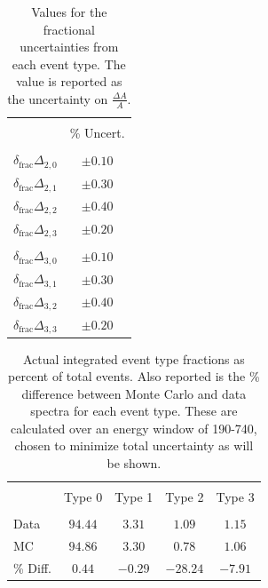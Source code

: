 \setlength{\tabcolsep}{12pt}

\begin{table}[h]
  \caption{Values for the fractional uncertainties from each
  event type. The value is reported as the uncertainty on $\frac{\Delta A}{A}$.} 
  \centering
  \begin{tabular}{l c }
    \hline \hline \\ [-1.75ex]
    & \% Uncert. \\
    \hline \\ [-1.75ex]
    $\delta_{\mathrm{frac}}\Delta_{2,0}$ & $\pm0.10$ \\ [0.50ex]
    $\delta_{\mathrm{frac}}\Delta_{2,1}$ & $\pm0.30$ \\ [0.50ex]
    $\delta_{\mathrm{frac}}\Delta_{2,2}$ & $\pm0.40$ \\ [0.50ex]
    $\delta_{\mathrm{frac}}\Delta_{2,3}$ & $\pm0.20$  \\ [0.50ex]
    \hline \\ [-1.75ex]
    $\delta_{\mathrm{frac}}\Delta_{3,0}$ & $\pm0.10$ \\ [0.50ex]
    $\delta_{\mathrm{frac}}\Delta_{3,1}$ & $\pm0.30$ \\ [0.50ex]
    $\delta_{\mathrm{frac}}\Delta_{3,2}$ & $\pm0.40$ \\ [0.50ex]
    $\delta_{\mathrm{frac}}\Delta_{3,3}$ & $\pm0.20$  \\ [0.50ex]
    \hline
  \end{tabular}
  \label{tab:frac}
\end{table}

\begin{table}[h]
  \caption{Actual integrated event type fractions as percent of
    total events. Also reported is the \% difference between Monte Carlo and data
    spectra for each event type. These are calculated over an energy window of
    190-740, chosen to minimize total uncertainty as will be shown.} 
  \centering
  \begin{tabular}{l c c c c }
    \hline \hline \\ [-1.75ex]
     & Type 0 & Type 1 & Type 2 & Type 3 \\
    \hline \\ [-1.75ex]
    Data & $94.44$ & $3.31$ & $1.09$ & $1.15$  \\ [0.50ex]
    MC & $94.86$ & $3.30$ & $0.78$ & $1.06$  \\ [0.50ex]
    \% Diff. & $0.44$ & $-0.29$ & $-28.24$ & $-7.91$  \\ [0.50ex]    
    \hline
  \end{tabular}
  \label{tab:integratedFrac}
\end{table}

